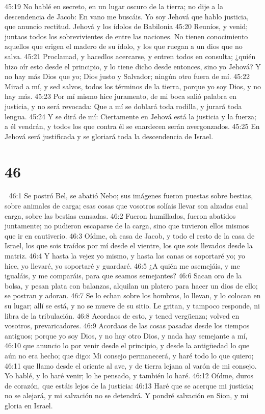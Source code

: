 45:19 No hablé en secreto, en un lugar oscuro de la tierra; no dije a la descendencia de Jacob: En vano me buscáis. Yo soy Jehová que hablo justicia, que anuncio rectitud.  
Jehová y los ídolos de Babilonia  
45:20 Reuníos, y venid; juntaos todos los sobrevivientes de entre las naciones. No tienen conocimiento aquellos que erigen el madero de su ídolo, y los que ruegan a un dios que no salva.  
45:21 Proclamad, y hacedlos acercarse, y entren todos en consulta; ¿quién hizo oír esto desde el principio, y lo tiene dicho desde entonces, sino yo Jehová? Y no hay más Dios que yo; Dios justo y Salvador; ningún otro fuera de mí.  
45:22 Mirad a mí, y sed salvos, todos los términos de la tierra, porque yo soy Dios, y no hay más.  
45:23 Por mí mismo hice juramento, de mi boca salió palabra en justicia, y no será revocada: Que a mí se doblará toda rodilla, y jurará toda lengua. 
45:24 Y se dirá de mí: Ciertamente en Jehová está la justicia y la fuerza; a él vendrán, y todos los que contra él se enardecen serán avergonzados.  
45:25 En Jehová será justificada y se gloriará toda la descendencia de Israel.  

\chapter{46}


46:1 Se postró Bel, se abatió Nebo; sus imágenes fueron puestas sobre bestias, sobre animales de carga; esas cosas que vosotros solíais llevar son alzadas cual carga, sobre las bestias cansadas.  
46:2 Fueron humillados, fueron abatidos juntamente; no pudieron escaparse de la carga, sino que tuvieron ellos mismos que ir en cautiverio.  
46:3 Oídme, oh casa de Jacob, y todo el resto de la casa de Israel, los que sois traídos por mí desde el vientre, los que sois llevados desde la matriz.  
46:4 Y hasta la vejez yo mismo, y hasta las canas os soportaré yo; yo hice, yo llevaré, yo soportaré y guardaré.  
46:5 ¿A quién me asemejáis, y me igualáis, y me comparáis, para que seamos semejantes?  
46:6 Sacan oro de la bolsa, y pesan plata con balanzas, alquilan un platero para hacer un dios de ello; se postran y adoran.  
46:7 Se lo echan sobre los hombros, lo llevan, y lo colocan en su lugar; allí se está, y no se mueve de su sitio. Le gritan, y tampoco responde, ni libra de la tribulación.  
46:8 Acordaos de esto, y tened vergüenza; volved en vosotros, prevaricadores.  
46:9 Acordaos de las cosas pasadas desde los tiempos antiguos; porque yo soy Dios, y no hay otro Dios, y nada hay semejante a mí,  
46:10 que anuncio lo por venir desde el principio, y desde la antigüedad lo que aún no era hecho; que digo: Mi consejo permanecerá, y haré todo lo que quiero;  
46:11 que llamo desde el oriente al ave, y de tierra lejana al varón de mi consejo. Yo hablé, y lo haré venir; lo he pensado, y también lo haré.  
46:12 Oídme, duros de corazón, que estáis lejos de la justicia:  
46:13 Haré que se acerque mi justicia; no se alejará, y mi salvación no se detendrá. Y pondré salvación en Sion, y mi gloria en Israel.  


